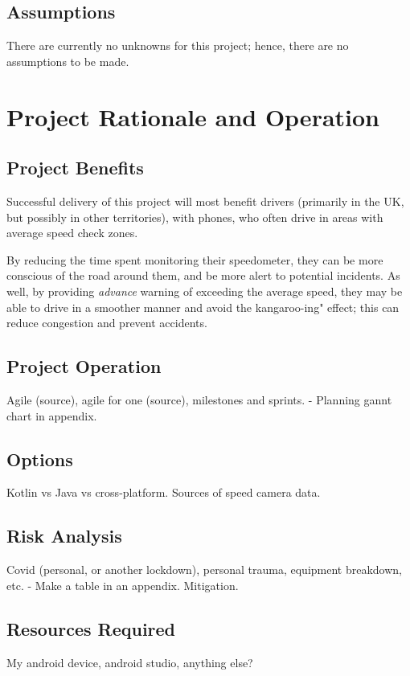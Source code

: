 \documentclass[11pt, a4paper, notitlepage]{report}
\begin{document}
\section{Assumptions}
There are currently no unknowns for this project; hence, there are no 
assumptions to be made.

\chapter{Project Rationale and Operation}
\section{Project Benefits}
Successful delivery of this project will most benefit drivers (primarily in the 
UK, but possibly in other territories), with phones, who often drive in areas 
with average speed check zones. 

By reducing the time spent monitoring their speedometer, they can be more 
conscious of the road around them, and be more alert to potential incidents. As 
well, by providing \textit{advance} warning of exceeding the average speed, 
they may be able to drive in a smoother manner and avoid the kangaroo-ing" 
effect; this can reduce congestion and prevent accidents.
\section{Project Operation}
Agile (source), agile for one (source), milestones and sprints. - Planning 
gannt chart in appendix.
\section{Options}
Kotlin vs Java vs cross-platform. Sources of speed camera data. 
\section{Risk Analysis}
Covid (personal, or another lockdown), personal trauma, equipment breakdown, 
etc. - Make a table in an appendix. Mitigation.
\section{Resources Required}
My android device, android studio, anything else?
\end{document}

